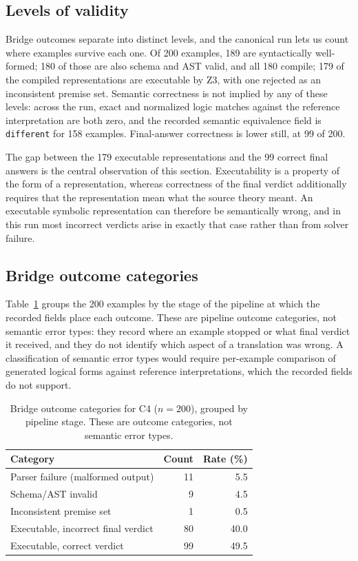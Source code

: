 \documentclass[conference]{IEEEtran}
\begin{document}


\subsection{Levels of validity}
Bridge outcomes separate into distinct levels, and the canonical run lets us count where examples survive each one. Of 200 examples, 189 are syntactically well-formed; 180 of those are also schema and AST valid, and all 180 compile; 179 of the compiled representations are executable by Z3, with one rejected as an inconsistent premise set. Semantic correctness is not implied by any of these levels: across the run, exact and normalized logic matches against the reference interpretation are both zero, and the recorded semantic equivalence field is \texttt{different} for 158 examples. Final-answer correctness is lower still, at 99 of 200.

The gap between the 179 executable representations and the 99 correct final answers is the central observation of this section. Executability is a property of the form of a representation, whereas correctness of the final verdict additionally requires that the representation mean what the source theory meant. An executable symbolic representation can therefore be semantically wrong, and in this run most incorrect verdicts arise in exactly that case rather than from solver failure.

\subsection{Bridge outcome categories}
Table~\ref{tab:outcomes} groups the 200 examples by the stage of the pipeline at which the recorded fields place each outcome. These are pipeline outcome categories, not semantic error types: they record where an example stopped or what final verdict it received, and they do not identify which aspect of a translation was wrong. A classification of semantic error types would require per-example comparison of generated logical forms against reference interpretations, which the recorded fields do not support.

\begin{table}[t]
\caption{Bridge outcome categories for C4 ($n=200$), grouped by pipeline stage. These are outcome categories, not semantic error types.}
\label{tab:outcomes}
\centering
\small
\begin{tabular}{lrr}
\toprule
Category & Count & Rate (\%) \\
\midrule
Parser failure (malformed output) & 11 & 5.5 \\
Schema/AST invalid & 9 & 4.5 \\
Inconsistent premise set & 1 & 0.5 \\
Executable, incorrect final verdict & 80 & 40.0 \\
Executable, correct verdict & 99 & 49.5 \\
\bottomrule
\end{tabular}
\end{table}
\end{document}
